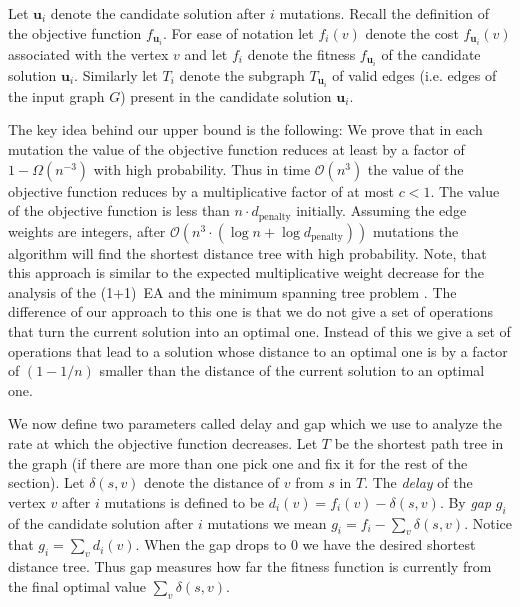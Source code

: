 \documentclass{sig-alternate}
\newcommand{\oneoneea}{(1+1)~EA\xspace}
\newcommand{\Oh}{\ensuremath{\mathcal{O}}}
\begin{document}
Let $\mathbf{u}_i$ denote the candidate solution after $i$ mutations.
Recall the definition of the objective function $f_{\mathbf{u}_i}$.
For ease of notation let $f_i(v)$ denote the cost
$f_{\mathbf{u}_i}(v)$ associated with the vertex $v$ and let $f_i$
denote the fitness $f_{\mathbf{u}_i}$ of the candidate solution
$\mathbf{u}_i$. Similarly let $T_i$ denote the subgraph
$T_{\mathbf{u}_i}$ of valid edges (i.e. edges of the input graph $G$)
present in the candidate solution $\mathbf{u}_i$.

The key idea behind our upper bound is the following: We prove that in
each mutation the value of the objective function reduces at least by
a factor of $1-\Omega(n^{-3})$ with high probability. Thus in
time $\Oh(n^3)$ the value of the objective function
reduces by a multiplicative factor of at most $c<1$.
The value of the objective function is less than $n \cdot d_\mathrm{penalty}$
initially. Assuming the edge weights are integers, after
$\Oh\left(n^3 \cdot (\log{n} +
\log{d_{\mathrm{penalty}}})\right)$ mutations the algorithm will find
the shortest distance tree with high probability.
Note, that this approach is similar to the expected multiplicative weight decrease for the analysis of the \oneoneea and the minimum spanning tree problem \cite{NeumannWegenerTCS}. The difference of our approach to this one is that we do not give a set of operations that turn the current solution into an optimal one. Instead of this we give a set of operations that lead to a solution whose distance to an optimal one is by a factor of $(1 - 1/n)$ smaller than the distance of the current solution to an optimal one.

We now define two parameters called delay and gap which we use to
analyze the rate at which the objective function decreases. Let $T$ be
the shortest path tree in the graph (if there are more than one pick
one and fix it for the rest of the section). Let $\delta(s,v)$ denote
the distance of $v$ from $s$ in $T$. The \emph{delay} of the vertex
$v$ after $i$ mutations is defined to be $d_i(v) = f_i(v) - \delta(s,
v)$. By \emph{gap} $g_i$ of the candidate solution after $i$ mutations
we mean $g_i = f_i - \sum_v \delta(s,v)$. Notice that $g_i = \sum_v
d_i(v)$.  When the gap drops to $0$ we have the desired shortest
distance tree. Thus gap measures how far the fitness function is
currently from the final optimal value $\sum_v \delta(s,v)$.


\end{document}
